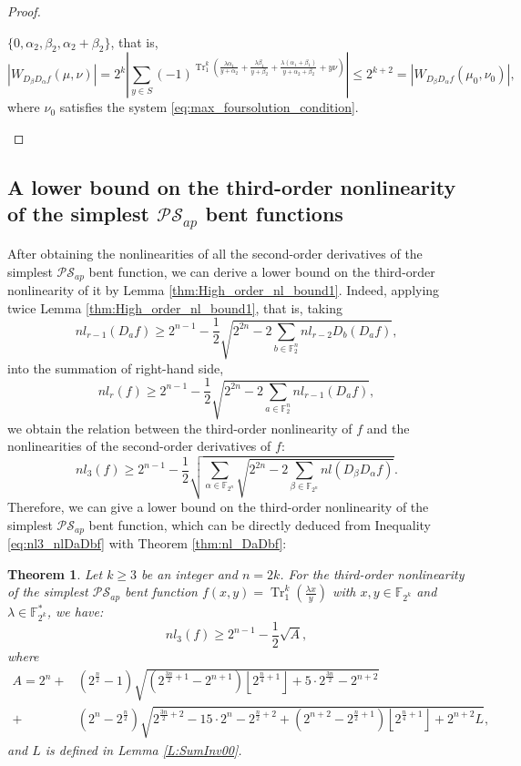 \documentclass{article}
\newcommand{\F}{\mathbb{F}}
\newcommand{\0}{\textbf{0}}
\newcommand{\1}{\textbf{1}}
\newcommand{\TRACE}{\operatorname{Tr}_1^k}
\theoremstyle{plain}
\newtheorem{theorem}{Theorem}
\begin{document}
\begin{proof}
\begin{enumerate}[label=\textbf{Case \arabic*},wide = 0pt]
            $\{0,\alpha_2,\beta_2,\alpha_2+\beta_2\}$, that is,
            \[ |W_{D_{\beta}D_{\alpha}f}(\mu,\nu)|=2^k\left\lvert\sum_{y\in S}(-1)^{\TRACE\left(\frac{\lambda\alpha_1}{y+\alpha_2}+\frac{\lambda\beta_1}{y+\beta_2}+\frac{\lambda(\alpha_1+\beta_1)}{y+\alpha_2+\beta_2}+ y\nu\right)}\right\rvert\le 2^{k+2}=|W_{D_{\beta}D_{\alpha}f}(\mu_0,\nu_0)|, \]
            where $\nu_0$ satisfies the system \eqref{eq:max_foursolution_condition}.
        \end{enumerate}
    \end{proof}

\subsection{A lower bound on the third-order nonlinearity of the simplest $\mathcal{PS}_{ap}$ bent functions}
    After obtaining the nonlinearities of all the second-order derivatives of the simplest $\mathcal{PS}_{ap}$ bent function, we can derive a lower bound on the third-order nonlinearity of it by Lemma \ref{thm:High_order_nl_bound1}.
    Indeed, applying twice Lemma \ref{thm:High_order_nl_bound1}, that is, taking
    \[nl_{r-1}(D_af) \ge 2^{n-1}-\frac{1}{2}\sqrt{2^{2n}-2\sum_{b\in\F_2^n}nl_{r-2}D_b(D_af)},\]
    into the summation  of right-hand side,
    \[nl_r(f) \ge 2^{n-1}-\frac{1}{2}\sqrt{2^{2n}-2\sum_{a\in\F_2^n}nl_{r-1}(D_af)},\]
    we obtain the relation between the third-order nonlinearity of $f$ and the nonlinearities of the second-order derivatives of $f$:
    \begin{equation}\label{eq:nl3_nlDaDbf}
        nl_3(f)\ge 2^{n-1}-\frac{1}{2}\sqrt{\sum_{\alpha\in\F_{2^n}}\sqrt{2^{2n}-2\sum_{\beta\in\F_{2^n}} nl(D_{\beta}D_{\alpha}f)}}.
    \end{equation}
    Therefore, we can give a lower bound on the third-order nonlinearity of the simplest $\mathcal{PS}_{ap}$ bent function, which can be directly deduced from Inequality \eqref{eq:nl3_nlDaDbf} with Theorem \ref{thm:nl_DaDbf}:
    \begin{theorem}\label{th:our_lower_bound}
        Let $k\ge 3$ be an integer and $n=2k$. For the third-order nonlinearity of the simplest $\mathcal{PS}_{ap}$ bent function $f(x,y)=\TRACE(\frac{\lambda x}{y})$ with $x,y\in\F_{2^k}$ and $\lambda\in\F_{2^k}^*$, we have:
        \[nl_3(f)\ge 2^{n-1}-\frac{1}{2}\sqrt{A},\]
        where
        \begin{align*}
            A=2^n+&(2^{\frac{n}{2}}-1)\sqrt{(2^{\frac{3n}{2}+1}-2^{n+1})\left\lfloor 2^{\frac{n}{4}+1}\right\rfloor+5\cdot 2^{\frac{3n}{2}}-2^{n+2}}\\
            +&(2^n-2^{\frac{n}{2}})\sqrt{2^{\frac{3n}{2}+2}-15\cdot 2^n-2^{\frac{n}{2}+2}+(2^{n+2}-2^{\frac{n}{2}+1})\left\lfloor 2^{\frac{n}{4}+1}\right\rfloor+2^{n+2}L},
        \end{align*}
        and $L$ is defined in Lemma \ref{L:SumInv00}.
    \end{theorem}
\end{document}
